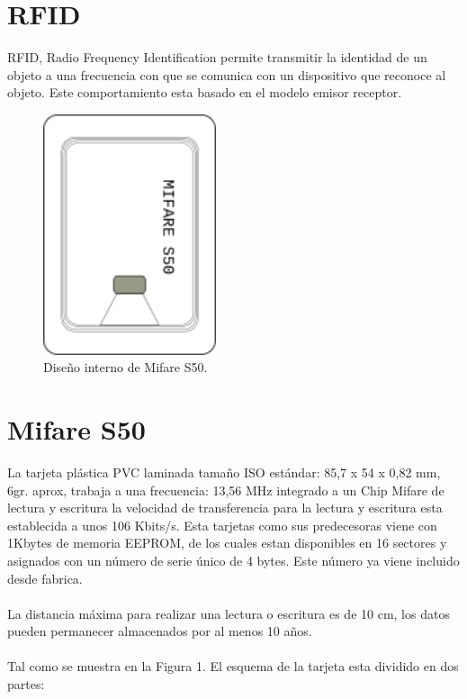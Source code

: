 \documentclass[11pt,twocolumn]{article}
\begin{document}
\section{RFID}

RFID, Radio Frequency Identification permite transmitir la identidad de un 
objeto a una frecuencia con que se comunica con un dispositivo que reconoce al 
objeto. Este comportamiento esta basado en el modelo emisor receptor. \\

\begin{figure}[t]
  \begin{center}
    \includegraphics[width=2in]{mifare.png}
  \end{center}

  \caption{\small Dise\~no interno de Mifare S50.}
  \label{fig-label}
\end{figure}

\section{Mifare S50}

La tarjeta plástica PVC laminada tamaño ISO estándar: 85,7 x 54 x 0,82 mm, 6gr. aprox, trabaja a una frecuencia: 13,56 MHz integrado a un Chip Mifare de lectura y escritura la velocidad de transferencia para la lectura y escritura esta establecida a unos 106 Kbits/s. Esta tarjetas como sus predecesoras viene  con 1Kbytes de memoria EEPROM, de los cuales estan disponibles en 16 sectores y asignados con un n\'umero de serie \'unico de 4 bytes. Este n\'umero ya viene incluido desde fabrica.\\
\\
La distancia m\'axima para realizar una lectura o escritura es de 10 cm, los datos pueden permanecer almacenados por al menos 10 a\~nos. \\
\\
Tal como se muestra en la Figura 1. El esquema de la tarjeta esta dividido en dos partes:\\
\end{document}
